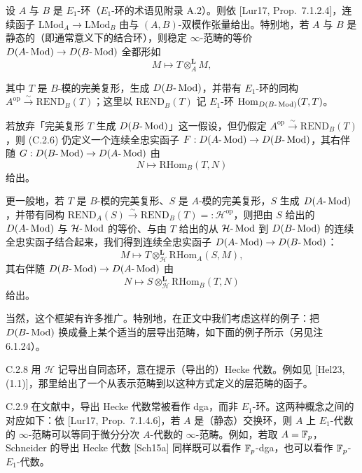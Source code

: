 设 $A$ 与 $B$ 是 $E_1$-环（$E_1$-环的术语见附录 A.2）。则依 [Lur17, Prop.~7.1.2.4]，连续函子 $\mathrm{LMod}_A\to\mathrm{LMod}_B$ 由与 $(A,B)$-双模作张量给出。特别地，若 $A$ 与 $B$ 是静态的（即通常意义下的结合环），则稳定 $\infty$-范畴的等价 $D(A\text{-}\operatorname{Mod})\to D(B\text{-}\operatorname{Mod})$ 全都形如
\begin{equation}\tag{C.2.6}\label{eq:a4-19-2}
M\mapsto T\otimes_A^{\mathbf L}M,
\end{equation}


其中 $T$ 是 $B$-模的完美复形，生成 $D(B\text{-}\operatorname{Mod})$，并带有 $E_1$-环的同构 $A^{\mathrm{op}}\xrightarrow{\sim}\mathrm{REND}_B(T)$；这里以 $\mathrm{REND}_B(T)$ 记 $E_1$-环 $\operatorname{Hom}_{D(B\text{-}\operatorname{Mod})}(T,T)$。

若放弃「完美复形 $T$ 生成 $D(B\text{-}\operatorname{Mod})$」这一假设，但仍假定 $A^{\mathrm{op}}\xrightarrow{\sim}\mathrm{REND}_B(T)$，则 (C.2.6) 仍定义一个连续全忠实函子 $F:D(A\text{-}\operatorname{Mod})\to D(B\text{-}\operatorname{Mod})$，其右伴随 $G:D(B\text{-}\operatorname{Mod})\to D(A\text{-}\operatorname{Mod})$ 由
\begin{equation}\tag{C.2.7}\label{eq:a4-19-3}
N\mapsto\mathrm{RHom}_B(T,N)
\end{equation}
给出。

更一般地，若 $T$ 是 $B$-模的完美复形、$S$ 是 $A$-模的完美复形，$S$ 生成 $D(A\text{-}\operatorname{Mod})$，并带有同构 $\mathrm{REND}_A(S)\xrightarrow{\sim}\mathrm{REND}_B(T)=:\mathcal H^{\mathrm{op}}$，则把由 $S$ 给出的 $D(A\text{-}\operatorname{Mod})$ 与 $\mathcal H\text{-}\operatorname{Mod}$ 的等价、与由 $T$ 给出的从 $\mathcal H\text{-}\operatorname{Mod}$ 到 $D(B\text{-}\operatorname{Mod})$ 的连续全忠实函子结合起来，我们得到连续全忠实函子 $D(A\text{-}\operatorname{Mod})\to D(B\text{-}\operatorname{Mod})$：
\[
M\mapsto T\otimes_{\mathcal H}^{\mathbf L}\mathrm{RHom}_A(S,M),
\]
其右伴随 $D(B\text{-}\operatorname{Mod})\to D(A\text{-}\operatorname{Mod})$ 由
\[
N\mapsto S\otimes_{\mathcal H}^{\mathbf L}\mathrm{RHom}_B(T,N)
\]
给出。

当然，这个框架有许多推广。特别地，在正文中我们考虑这样的例子：把 $D(B\text{-}\operatorname{Mod})$ 换成叠上某个适当的层导出范畴，如下面的例子所示（另见注 6.1.24）。

\begin{rem}{C.2.8}\label{thm:a4-19-4}
用 $\mathcal H$ 记导出自同态环，意在提示（导出的）Hecke 代数。例如见 [Hel23, (1.1)]，那里给出了一个从表示范畴到以这种方式定义的层范畴的函子。
\end{rem}

\begin{rem}{C.2.9}\label{thm:a4-19-5}
在文献中，导出 Hecke 代数常被看作 dga，而非 $E_1$-环。这两种概念之间的对应如下：依 [Lur17, Prop.~7.1.4.6]，若 $A$ 是（静态）交换环，则 $A$ 上 $E_1$-代数的 $\infty$-范畴可以等同于微分分次 $A$-代数的 $\infty$-范畴。例如，若取 $A=\mathbb{F}_p$，Schneider 的导出 Hecke 代数 [Sch15a] 同样既可以看作 $\mathbb{F}_p$-dga，也可以看作 $\mathbb{F}_p$-$E_1$-代数。
\end{rem}

